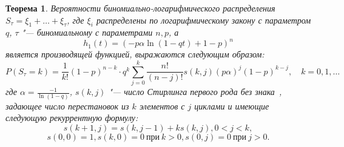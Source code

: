 \documentclass[12pt, specialist, subf, substylefile = spbu_report.rtx]{disser}
\newtheorem{theorem}{Теорема}
\begin{document}
	\begin{theorem}
		Вероятности биномиально-логарифмического распределения $S _\tau = \xi _1 + \dots + \xi _\tau$, где $\xi _i$ распределены по логарифмическому закону с параметром $q$, $\tau$ "--- биномиальному с параметрами $n, p$, а
		\[
			h _1(t) = \left(-p \alpha \ln (1 - qt) + 1 - p\right) ^n
		\]
		является производящей функцией, выражаются следующим образом:
		\label{theorem:probBLR}
		\begin{equation} \label{eq:probBLR}
			P(S _\tau = k) = \frac 1 {k!} (1 - p) ^{n - k} \cdot q ^k \sum \limits ^{k} _{j = 0} \frac {n!} {(n - j)!} s(k, j) (p \alpha) ^j (1 - p) ^{k - j},\quad k = 0, 1, \dots
		\end{equation}
		где $ \alpha = \frac {-1} {\ln(1 - q)} $, $ s(k, j) $ "--- число Стирлинга первого рода без знака~\cite{bib:knuth1998}, задающее число перестановок из $ k $ элементов с $ j $ циклами и имеющие следующую рекуррентную формулу:
		\[
			s(k + 1, j) = s(k, j - 1) + k s(k, j), 0 < j < k,
		\]
		\[
			s(0, 0) = 1, s(k, 0) = 0~\text{при}~ k > 0, s(0, j) = 0~\text{при}~ j > 0.
		\]
	\end{theorem}
\end{document}
